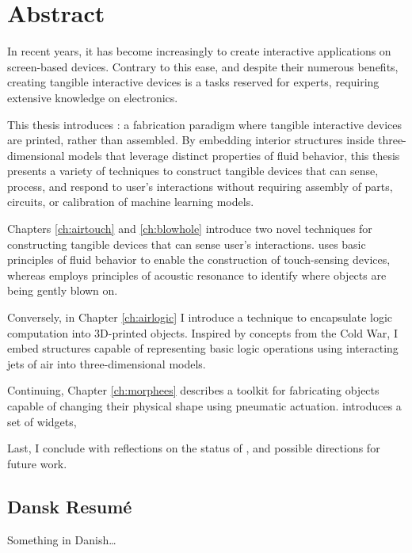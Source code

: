 \begingroup
	\let\clearpage\relax
	\let\cleardoublepage\relax
	\let\cleardoublepage\relax

	\chapter*{Abstract}
		In recent years, it has become increasingly  to create interactive
		applications on screen-based devices. Contrary to this ease, and despite
		their numerous benefits, creating tangible interactive devices is a tasks
		reserved for experts, requiring extensive knowledge on electronics.  

		This thesis introduces \emph{\papf}: a fabrication paradigm where tangible
		interactive devices are printed, rather than assembled. By embedding
		interior structures inside three-dimensional models that leverage distinct
		properties of fluid behavior, this thesis presents a variety of techniques
		to construct tangible devices that can sense, process, and respond to user's
		interactions without requiring assembly of parts, circuits, or calibration
		of machine learning models.

		Chapters \ref{ch:airtouch} and \ref{ch:blowhole} introduce two novel
		techniques for constructing tangible devices that can sense user's
		interactions. \at uses basic principles of fluid behavior to enable the
		construction of touch-sensing devices, whereas \bh employs principles of
		acoustic resonance to identify where objects are being gently blown on.

		Conversely, in Chapter \ref{ch:airlogic} I introduce a technique to
		encapsulate logic computation into 3D-printed objects. Inspired by concepts
		from the Cold War, I embed structures capable of representing basic logic
		operations using interacting jets of air into three-dimensional models.

		Continuing, Chapter \ref{ch:morphees} describes a toolkit for fabricating
		objects capable of changing their physical shape using pneumatic actuation.
		\mp introduces a set of widgets,

		Last, I conclude with reflections on the status of \papf, and possible
		directions for future work.

		\newpage

		\begin{otherlanguage}{danish}
			\chapter*{Dansk Resum\'e}
			Something in Danish\dots
		\end{otherlanguage}

\endgroup

	\vfill

